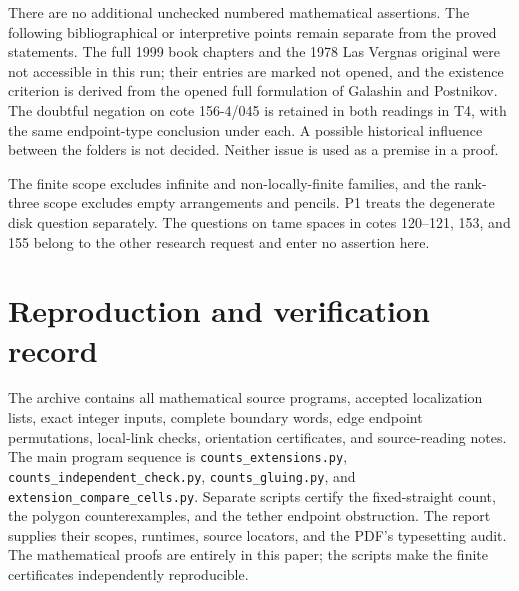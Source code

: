 \documentclass[11pt,a4paper]{article}
\begin{document}
There are no additional unchecked numbered mathematical assertions.
The following bibliographical or interpretive points remain separate
from the proved statements. The full 1999 book chapters and the 1978
Las Vergnas original were not accessible in this run; their entries
are marked not opened, and the existence criterion is derived from
the opened full formulation of Galashin and Postnikov. The doubtful
negation on cote 156-4/045 is retained in both readings in T4, with
the same endpoint-type conclusion under each. A possible historical
influence between the folders is not decided. Neither issue is used
as a premise in a proof.

The finite scope excludes infinite and non-locally-finite families,
and the rank-three scope excludes empty arrangements and pencils.
P1 treats the degenerate disk question separately. The questions on
tame spaces in cotes 120--121, 153, and 155 belong to the other
research request and enter no assertion here.

\section{Reproduction and verification record}
The archive contains all mathematical source programs, accepted
localization lists, exact integer inputs, complete boundary words,
edge endpoint permutations, local-link checks, orientation certificates,
and source-reading notes. The main program sequence is
\texttt{counts\_extensions.py},
\texttt{counts\_independent\_check.py},
\texttt{counts\_gluing.py}, and
\texttt{extension\_compare\_cells.py}. Separate scripts certify the
fixed-straight count, the polygon counterexamples, and the tether
endpoint obstruction. The report supplies their scopes, runtimes,
source locators, and the PDF's typesetting audit. The mathematical
proofs are entirely in this paper; the scripts make the finite
certificates independently reproducible.

\nocite{*}


\end{document}

